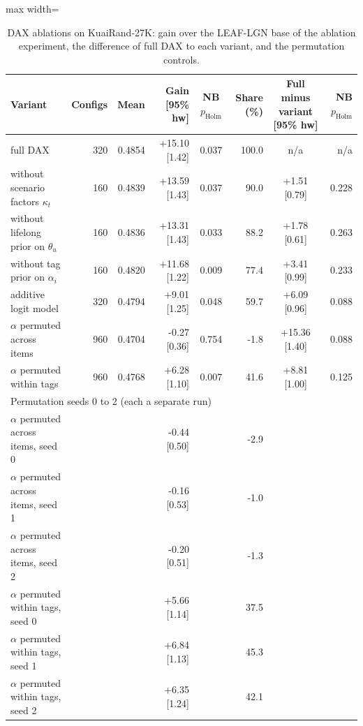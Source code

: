 \documentclass[preprint,12pt,authoryear]{elsarticle}
\begin{document}
\begin{table}[tbp]
\centering
\footnotesize
\caption{DAX ablations on KuaiRand-27K: gain over the LEAF-LGN base of the ablation experiment, the difference of full DAX to each variant, and the permutation controls.}
\label{tab:ablate}
\begin{adjustbox}{max width=\linewidth}
\begin{tabular}{lrrrcrcr}
\toprule
Variant & Configs & Mean & Gain [95\% hw] & NB $p_{\mathrm{Holm}}$ & Share (\%) & Full minus variant [95\% hw] & NB $p_{\mathrm{Holm}}$ \\
\midrule
full DAX & 320 & 0.4854 & +15.10 [1.42] & 0.037 & 100.0 & n/a & n/a \\
without scenario factors $\kappa_t$ & 160 & 0.4839 & +13.59 [1.43] & 0.037 & 90.0 & +1.51 [0.79] & 0.228 \\
without lifelong prior on $\theta_u$ & 160 & 0.4836 & +13.31 [1.43] & 0.033 & 88.2 & +1.78 [0.61] & 0.263 \\
without tag prior on $\alpha_i$ & 160 & 0.4820 & +11.68 [1.22] & 0.009 & 77.4 & +3.41 [0.99] & 0.233 \\
additive logit model & 320 & 0.4794 & +9.01 [1.25] & 0.048 & 59.7 & +6.09 [0.96] & 0.088 \\
$\alpha$ permuted across items & 960 & 0.4704 & -0.27 [0.36] & 0.754 & -1.8 & +15.36 [1.40] & 0.088 \\
$\alpha$ permuted within tags & 960 & 0.4768 & +6.28 [1.10] & 0.007 & 41.6 & +8.81 [1.00] & 0.125 \\
\midrule
\multicolumn{8}{l}{Permutation seeds 0 to 2 (each a separate run)} \\
$\alpha$ permuted across items, seed 0 &  &  & -0.44 [0.50] &  & -2.9 &  &  \\
$\alpha$ permuted across items, seed 1 &  &  & -0.16 [0.53] &  & -1.0 &  &  \\
$\alpha$ permuted across items, seed 2 &  &  & -0.20 [0.51] &  & -1.3 &  &  \\
$\alpha$ permuted within tags, seed 0 &  &  & +5.66 [1.14] &  & 37.5 &  &  \\
$\alpha$ permuted within tags, seed 1 &  &  & +6.84 [1.13] &  & 45.3 &  &  \\
$\alpha$ permuted within tags, seed 2 &  &  & +6.35 [1.24] &  & 42.1 &  &  \\
\bottomrule
\end{tabular}
\end{adjustbox}
\par\smallskip

\end{table}
\end{document}

